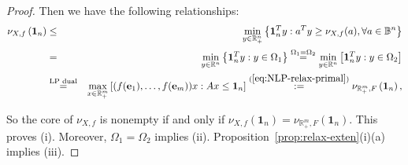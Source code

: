 \documentclass[11pt]{article}\usepackage[]{graphicx}\usepackage[]{xcolor}
\begin{document}
\begin{proof}
Then we have the following relationships:  
\begin{eqnarray*}
\nonumber \nu_{X, f}\left(\mathbf{1}_n\right)&\le &\min\limits_{y\in\mathbb{R}^{n}_{+}}\left\{\mathbf{1}_n^Ty: a^Ty\ge \nu_{X, f}(a), \forall a\in\mathbb{B}^n\right\}\\
\nonumber&=&\min\limits_{y\in\mathbb{R}^{n}}\left\{\mathbf{1}_n^Ty: y\in \Omega_1\right\}\overset{\Omega_1=\Omega_2}{=}\min\limits_{y\in\mathbb{R}^{n}} \left[\mathbf{1}_n^Ty: y\in \Omega_2\right]\\
\nonumber&\overset{\text{LP dual}}{=}&\max\limits_{x\in \mathbb{R}^m_{+}} \left[(f(\mathbf{e}_1),\dots, f(\mathbf{e}_m))x: Ax\le \mathbf{1}_n\right]\overset{(\ref{eq:NLP-relax-primal})}{:=}\nu_{\mathbb{R}^m_{+}, F}\left(\mathbf{1}_n\right),
\end{eqnarray*}

So the core of $\nu_{X, f}$ is nonempty if and only if $\nu_{X, f}\left(\mathbf{1}_n\right)=\nu_{\mathbb{R}^m_{+}, F}\left(\mathbf{1}_n\right)$. This proves (i). Moreover, $\Omega_1=\Omega_2$ implies (ii). Proposition~\ref{prop:relax-exten}(i)(a) implies (iii).  
\end{proof}
\end{document}
